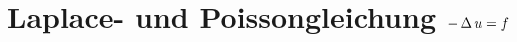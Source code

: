 \documentclass[german,color,5pt]{latex4ei/latex4ei_fs}
\begin{document}
\section{Laplace- und Poissongleichung \qquad $-\operatorname{\Delta} u = f$}
	
\end{document}
